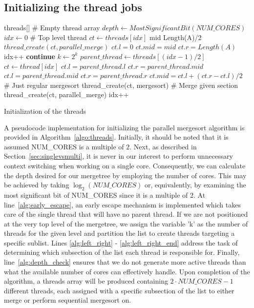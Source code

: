 \subsection{Initializing the thread jobs}\label{sec:init_threads}
\begin{algorithm}
  \begin{algorithmic}[1]
    \Require threads[] \# Empty thread array
    \State $depth \leftarrow MostSignificantBit(NUM\_CORES)$
    \State $idx \leftarrow 0$
     \label{alg:early_escape}
    \State \# Top level thread
    \State $ct \leftarrow threads[idx]$
    \State mid \leftarrow Length(A)/2
    \State $thread\_create(ct, parallel\_merge)$
    \State $ct.l = 0$
    \State $ct.mid = mid$
    \State $ct.r = Length(A)$
    \State idx++
    \State \textbf{continue}
    \EndIf
    \State $k \leftarrow 2^k$
    \State $parent\_thread \leftarrow threads[(idx - 1)/2]$
    \State $ct \leftarrow thread[idx]$
     \label{alg:left_right}
    \State $ct.l = parent\_thread.l$
    \State $ct.r = parent\_thread.mid$
    \Else
    \State $ct.l = parent\_thread.mid$
    \State $ct.r = parent\_thread.r$
    \EndIf
    \State $ct.mid = ct.l + (ct.r - ct.l)/2$ \label{alg:left_right_end}
     \label{alg:depth_check}
    \State \# Just regular mergesort
    \State thread\_create(ct, mergesort)
    \Else
    \State \# Merge given section
    \State thread\_create(ct, parallel\_merge)
    \EndIf
    \State idx++
    \EndFor
    \EndFor
  \EndProcedure
  \end{algorithmic}
  \caption{Initialization of the threads}\label{algo:threads}
\end{algorithm}
A pseudocode implementation for initializing the parallel mergesort algorithm is
provided in Algorithm~\ref{algo:threads}. Initially, it should be noted that it
is assumed NUM\_CORES is a multiple of 2. Next, as described in
Section~\ref{sec:singlevsmulti}, it is never in our interest to perform
unnecessary context switching when working on a single core. Consequently, we
can calculate the depth desired for our mergetree by employing the number of
cores. This may be achieved by taking $\log_2(NUM\_CORES)$ or, equivalently, by
examining the most significant bit of NUM\_CORES since it is a multiple of 2. At
line~\ref{alg:early_escape}, an early escape mechanism is implemented which
takes care of the single thread that will have no parent thread. If we are not
positioned at the very top level of the mergetree, we assign the variable 'k' as
the number of threads for the given level and partition the list to create
threads targeting a specific sublist. Lines \ref{alg:left_right} -
\ref{alg:left_right_end} address the task of determining which subsection of the
list each thread is responsible for. Finally, line~\ref{alg:depth_check} ensures
that we do not generate more active threads than what the available number of
cores can effectively handle. Upon completion of the algorithm, a threads array
will be produced containing $2 \cdot NUM\_CORES - 1$ different threads, each
assigned with a specific subsection of the list to either merge or perform
sequential mergesort on.

